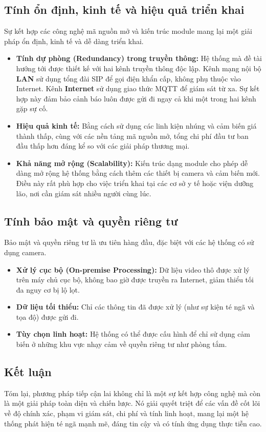 \subsection{Tính ổn định, kinh tế và hiệu quả triển khai}

Sự kết hợp các công nghệ mã nguồn mở và kiến trúc module mang lại một giải pháp ổn định, kinh tế và dễ dàng triển khai.

\begin{itemize}
    \item \textbf{Tính dự phòng (Redundancy) trong truyền thông:} Hệ thống mà đề tài hướng tới được thiết kế với hai kênh truyền thông độc lập. Kênh mạng nội bộ \textbf{LAN} sử dụng tổng đài SIP để gọi điện khẩn cấp, không phụ thuộc vào Internet. Kênh \textbf{Internet} sử dụng giao thức MQTT để giám sát từ xa. Sự kết hợp này đảm bảo cảnh báo luôn được gửi đi ngay cả khi một trong hai kênh gặp sự cố.
    \item \textbf{Hiệu quả kinh tế:} Bằng cách sử dụng các linh kiện nhúng và cảm biến giá thành thấp, cùng với các nền tảng mã nguồn mở, tổng chi phí đầu tư ban đầu thấp hơn đáng kể so với các giải pháp thương mại.
    \item \textbf{Khả năng mở rộng (Scalability):} Kiến trúc dạng module cho phép dễ dàng mở rộng hệ thống bằng cách thêm các thiết bị camera và cảm biến mới. Điều này rất phù hợp cho việc triển khai tại các cơ sở y tế hoặc viện dưỡng lão, nơi cần giám sát nhiều người cùng lúc.
\end{itemize}

\subsection{Tính bảo mật và quyền riêng tư}

Bảo mật và quyền riêng tư là ưu tiên hàng đầu, đặc biệt với các hệ thống có sử dụng camera.

\begin{itemize}
    \item \textbf{Xử lý cục bộ (On-premise Processing):} Dữ liệu video thô được xử lý trên máy chủ cục bộ, không bao giờ được truyền ra Internet, giảm thiểu tối đa nguy cơ bị lộ lọt.
    \item \textbf{Dữ liệu tối thiểu:} Chỉ các thông tin đã được xử lý (như sự kiện té ngã và tọa độ) được gửi đi.
    \item \textbf{Tùy chọn linh hoạt:} Hệ thống có thể được cấu hình để chỉ sử dụng cảm biến ở những khu vực nhạy cảm về quyền riêng tư như phòng tắm.
\end{itemize}

\subsection{Kết luận}

Tóm lại, phương pháp tiếp cận lai không chỉ là một sự kết hợp công nghệ mà còn là một giải pháp toàn diện và chiến lược. Nó giải quyết triệt để các vấn đề cốt lõi về độ chính xác, phạm vi giám sát, chi phí và tính linh hoạt, mang lại một hệ thống phát hiện té ngã mạnh mẽ, đáng tin cậy và có tính ứng dụng thực tiễn cao.
